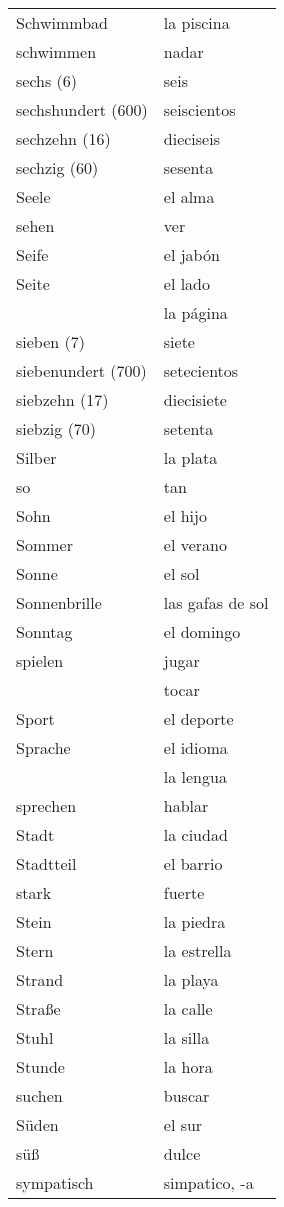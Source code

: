 \begin{longtable}{p{} p{}}
Schwimmbad & la piscina\\
schwimmen & nadar\\
sechs (6) & seis\\
sechshundert (600) & seiscientos\\
sechzehn (16) & dieciseis\\
sechzig (60) & sesenta\\
Seele & el alma\\
sehen & ver\\
Seife & el jabón\\
Seite & el lado\\
~ & la página\\
sieben (7) & siete\\
siebenundert (700) & setecientos\\
siebzehn (17) & diecisiete\\
siebzig (70) & setenta\\
Silber & la plata\\
so & tan\\
Sohn & el hijo\\
Sommer & el verano\\
Sonne & el sol\\
Sonnenbrille & las gafas de sol\\
Sonntag & el domingo\\
spielen & jugar\\
~ & tocar\\
Sport & el deporte\\
Sprache & el idioma\\
~ & la lengua\\
sprechen & hablar\\
Stadt & la ciudad\\
Stadtteil & el barrio\\
stark & fuerte\\
Stein & la piedra\\
Stern & la estrella\\
Strand & la playa\\
Straße & la calle\\
Stuhl & la silla\\
Stunde & la hora\\
suchen & buscar\\
Süden & el sur\\
süß & dulce\\
sympatisch & simpatico, -a\\
\end{longtable}
